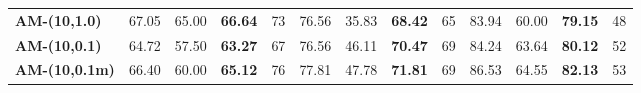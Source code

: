 \begin{table}[H]
{\begin{tabular}{lcccccccccccc}
			\multicolumn{1}{l|}{\cellcolor[HTML]{D9D9D9}\textbf{AM-(10,1.0)}} &
			\multicolumn{1}{c|}{67.05} &
			\multicolumn{1}{c|}{65.00} &
			\multicolumn{1}{c|}{{\color[HTML]{333333} \textbf{66.64}}} &
			\multicolumn{1}{c|}{73} &
			\multicolumn{1}{c|}{76.56} &
			\multicolumn{1}{c|}{35.83} &
			\multicolumn{1}{c|}{{\color[HTML]{333333} \textbf{68.42}}} &
			\multicolumn{1}{c|}{65} &
			\multicolumn{1}{c|}{83.94} &
			\multicolumn{1}{c|}{60.00} &
			\multicolumn{1}{c|}{{\color[HTML]{333333} \textbf{79.15}}} &
			\multicolumn{1}{c|}{48} \\ \cline{2-13} 
			\multicolumn{1}{l|}{\cellcolor[HTML]{D9D9D9}\textbf{AM-(10,0.1)}} &
			\multicolumn{1}{c|}{64.72} &
			\multicolumn{1}{c|}{57.50} &
			\multicolumn{1}{c|}{{\color[HTML]{333333} \textbf{63.27}}} &
			\multicolumn{1}{c|}{67} &
			\multicolumn{1}{c|}{76.56} &
			\multicolumn{1}{c|}{46.11} &
			\multicolumn{1}{c|}{{\color[HTML]{333333} \textbf{70.47}}} &
			\multicolumn{1}{c|}{69} &
			\multicolumn{1}{c|}{84.24} &
			\multicolumn{1}{c|}{63.64} &
			\multicolumn{1}{c|}{{\color[HTML]{333333} \textbf{80.12}}} &
			\multicolumn{1}{c|}{52} \\ \cline{2-13} 
			\multicolumn{1}{l|}{\cellcolor[HTML]{D9D9D9}\textbf{AM-(10,0.1m)}} &
			\multicolumn{1}{c|}{66.40} &
			\multicolumn{1}{c|}{60.00} &
			\multicolumn{1}{c|}{{\color[HTML]{333333} \textbf{65.12}}} &
			\multicolumn{1}{c|}{76} &
			\multicolumn{1}{c|}{77.81} &
			\multicolumn{1}{c|}{47.78} &
			\multicolumn{1}{c|}{{\color[HTML]{333333} \textbf{71.81}}} &
			\multicolumn{1}{c|}{69} &
			\multicolumn{1}{c|}{86.53} &
			\multicolumn{1}{c|}{64.55} &
			\multicolumn{1}{c|}{{\color[HTML]{333333} \textbf{82.13}}} &
			\multicolumn{1}{c|}{53} \\ \cline{2-13} 
		\end{tabular}%
	}
\end{table}